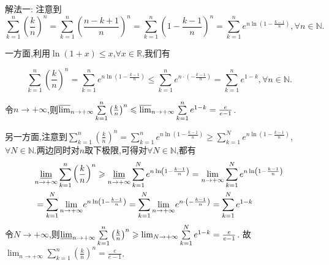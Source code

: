 \documentclass[../../main.tex]{subfiles}%
\begin{document}
\begin{solution}

{\color{blue}解法一:}
注意到
\[
\sum\limits_{k = 1}^{n}\left(\frac{k}{n}\right)^n = \sum\limits_{k = 1}^{n}\left(\frac{n - k + 1}{n}\right)^n = \sum\limits_{k = 1}^{n}\left(1 - \frac{k - 1}{n}\right)^n = \sum\limits_{k = 1}^{n}e^{n\ln\left(1 - \frac{k - 1}{n}\right)},  \forall n \in \mathbb{N}.
\]

一方面,利用\(\ln(1 + x) \leqslant  x\),\(\forall x \in \mathbb{R}\),我们有

\[
\sum\limits_{k = 1}^{n}\left(\frac{k}{n}\right)^n = \sum\limits_{k = 1}^{n}e^{n\ln\left(1 - \frac{k - 1}{n}\right)} \leqslant  \sum\limits_{k = 1}^{n}e^{n\cdot\left(-\frac{k - 1}{n}\right)} = \sum\limits_{k = 1}^{n}e^{1 - k},  \forall n \in \mathbb{N}.
\]

令\(n \to +\infty\),则\(\varlimsup_{n \to +\infty}\sum\limits_{k = 1}^{n}\left(\frac{k}{n}\right)^n \leqslant  \varlimsup_{n \to +\infty}\sum\limits_{k = 1}^{n}e^{1 - k} = \frac{e}{e - 1}\).

另一方面,注意到\(\sum\limits_{k = 1}^{n}\left(\frac{k}{n}\right)^n = \sum\limits_{k = 1}^{n}e^{n\ln\left(1 - \frac{k - 1}{n}\right)} \geqslant  \sum\limits_{k = 1}^{N}e^{n\ln\left(1 - \frac{k - 1}{n}\right)}\),\(\forall N \in \mathbb{N}\).两边同时对\(n\)取下极限,可得对\(\forall N \in \mathbb{N}\),都有
\begin{align*}
&\underset{n\rightarrow +\infty}{{\varliminf }}\sum\limits_{k=1}^n{\left( \frac{k}{n} \right) ^n}\geqslant \underset{n\rightarrow +\infty}{{\varliminf }}\sum\limits_{k=1}^N{e^{n\ln \left( 1-\frac{k-1}{n} \right)}}=\underset{n\rightarrow +\infty}{\lim}\sum\limits_{k=1}^N{e^{n\ln \left( 1-\frac{k-1}{n} \right)}}
\\
&=\sum\limits_{k=1}^N{\underset{n\rightarrow +\infty}{\lim}e^{n\ln \left( 1-\frac{k-1}{n} \right)}}=\sum\limits_{k=1}^N{\underset{n\rightarrow +\infty}{\lim}e^{n\cdot \left( -\frac{k-1}{n} \right)}}=\sum\limits_{k=1}^N{e^{1-k}}
\end{align*}
令\(N \to +\infty\),则\(\varliminf_{n \to +\infty}\sum\limits_{k = 1}^{n}\left(\frac{k}{n}\right)^n \geqslant  \lim_{N \to +\infty}\sum\limits_{k = 1}^{N}e^{1 - k} = \frac{e}{e - 1}\).
故\(\lim_{n \to +\infty}\sum\limits_{k = 1}^{n}\left(\frac{k}{n}\right)^n = \frac{e}{e - 1}\). 


\end{solution}
\end{document}
